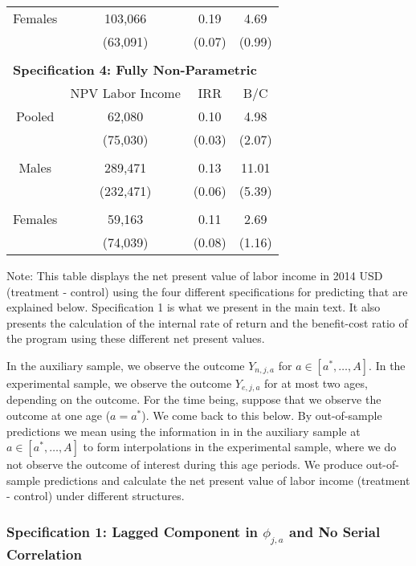 \begin{table}[H]
\begin{threeparttable}
\begin{tabular}{cccc}
Females & 103,066 & 0.19  & 4.69 \\  
          & (63,091) & (0.07)  & (0.99) \\ \midrule \\ 
\multicolumn{4}{l}{\textbf{Specification 4:  Fully Non-Parametric}} \\ 
& NPV Labor Income & IRR & B/C \\
Pooled  & 62,080 & 0.10 & 4.98 \\ 
             & (75,030) & (0.03)  & (2.07) \\ \\ 
Males & 289,471& 0.13  & 11.01 \\ 
               & (232,471) & (0.06) & (5.39) \\ \\ 
Females & 59,163 &  0.11 & 2.69 \\  
          & (74,039) & (0.08)  & (1.16) \\ \bottomrule
\end{tabular}
\begin{tablenotes}
\footnotesize
\item Note: This table displays the net present value of labor income in 2014 USD (treatment - control) using the four different specifications for predicting that are explained below. Specification 1 is what we present in the main text. It also presents the calculation of the internal rate of return and the benefit-cost ratio of the program using these different net present values.
\end{tablenotes}
\end{threeparttable}
\end{table}

\noindent In the auxiliary sample, we observe the outcome $Y_{n,j,a}$ for $a \in [a^*, \ldots, A]$. In the experimental sample, we observe the outcome $Y_{e,j,a}$ for at most two ages, depending on the outcome. For the time being, suppose that we observe the outcome at one age ($a = a^*$). We come back to this below. By out-of-sample predictions we mean using the information in in the auxiliary sample at  $a \in [a^*, \ldots, A]$ to form interpolations in the experimental sample, where we do not observe the outcome of interest during this age periods. We produce out-of-sample predictions and calculate the net present value of labor income (treatment - control) under different structures.\\ 

\subsubsection{Specification 1: Lagged Component in $\phi_{j,a}$ and No Serial Correlation}


